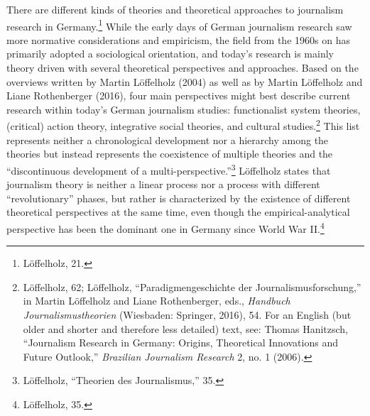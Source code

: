 \documentclass{tufte-handout}
\begin{document}
There are different kinds of theories and theoretical approaches to
journalism research in Germany.\footnote{Löffelholz, 21.} While the
early days of German journalism research saw more normative
considerations and empiricism, the field from the 1960s on has primarily
adopted a sociological orientation, and today's research is mainly
theory driven with several theoretical perspectives and approaches.
Based on the overviews written by Martin Löffelholz (2004) as well as by
Martin Löffelholz and Liane Rothenberger (2016), four main perspectives
might best describe current research within today's German journalism
studies: functionalist system theories, (critical) action theory,
integrative social theories, and cultural studies.\footnote{Löffelholz,
  62; Löffelholz, ``Paradigmengeschichte der Journalismusforschung,'' in
  Martin Löffelholz and Liane Rothenberger, eds., \emph{Handbuch
  Journalismustheorien} (Wiesbaden: Springer, 2016), 54. For an English
  (but older and shorter and therefore less detailed) text, see: Thomas
  Hanitzsch, ``Journalism Research in Germany: Origins, Theoretical
  Innovations and Future Outlook,'' \emph{Brazilian Journalism Research}
  2, no. 1 (2006).} This list represents neither a chronological
development nor a hierarchy among the theories but instead represents
the coexistence of multiple theories and the ``discontinuous development
of a multi-perspective.''\footnote{Löffelholz, ``Theorien des
  Journalismus,'' 35.} Löffelholz states that journalism theory is
neither a linear process nor a process with different ``revolutionary''
phases, but rather is characterized by the existence of different
theoretical perspectives at the same time, even though the
empirical-analytical perspective has been the dominant one in Germany
since World War II.\footnote{Löffelholz, 35.}
\end{document}
